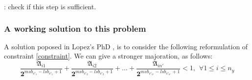 		\TODO: check if this step is sufficient.

		\subsubsection{A working solution to this problem}
		A solution poposed in Lopez's PhD \cite{lopez}, is to consider the following reformulation of constraint \ref{constraint}.
		We can give a stronger majoration, as follows:
		\begin{equation}
			\frac{\mathfrak{A}_{i1}}{\boldsymbol{2}^{msb_{v'_1}-lsb_{v'_1}+1}} + \frac{\mathfrak{A}_{i2}}{\boldsymbol{2}^{msb_{v'_2}-lsb_{v'_2}+1}} + \dots + \frac{\mathfrak{A}_{in'}}{\boldsymbol{2}^{msb_{v'_{n'}}-lsb_{v'_{n'}}+1}} < 1, \hspace{5pt} \forall 1 \leq i \leq n_y 
		\end{equation}
		











	





%		
%		
%
%	
%
%



	



